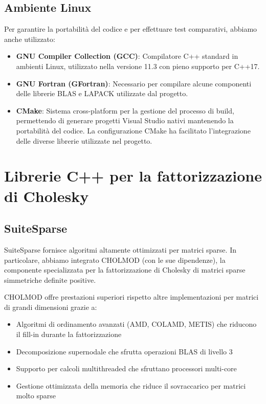 \subsection{Ambiente Linux}
Per garantire la portabilità del codice e per effettuare test comparativi, abbiamo anche utilizzato:

\begin{itemize}
    \item \textbf{GNU Compiler Collection (GCC)}: Compilatore C++ standard in ambienti Linux, utilizzato nella versione 11.3 con pieno supporto per C++17.
    
    \item \textbf{GNU Fortran (GFortran)}: Necessario per compilare alcune componenti delle librerie BLAS e LAPACK utilizzate dal progetto.
    
    \item \textbf{CMake}: Sistema cross-platform per la gestione del processo di build, permettendo di generare progetti Visual Studio nativi mantenendo la portabilità del codice. La configurazione CMake ha facilitato l'integrazione delle diverse librerie utilizzate nel progetto.
\end{itemize}

\section{Librerie C++ per la fattorizzazione di Cholesky}

\subsection{SuiteSparse}
SuiteSparse fornisce algoritmi altamente ottimizzati per matrici sparse. In particolare, abbiamo integrato CHOLMOD (con le sue dipendenze), 
la componente specializzata per la fattorizzazione di Cholesky di matrici sparse simmetriche definite positive.

CHOLMOD offre prestazioni superiori rispetto altre implementazioni per matrici di grandi dimensioni grazie a:

\begin{itemize}
    \item Algoritmi di ordinamento avanzati (AMD, COLAMD, METIS) che riducono il fill-in durante la fattorizzazione
    \item Decomposizione supernodale che sfrutta operazioni BLAS di livello 3
    \item Supporto per calcoli multithreaded che sfruttano processori multi-core
    \item Gestione ottimizzata della memoria che riduce il sovraccarico per matrici molto sparse
\end{itemize}


